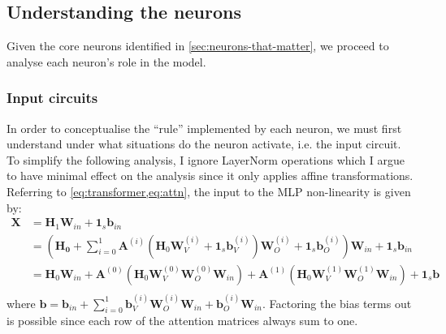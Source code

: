 \documentclass{article}
\renewcommand{\v}[1]{\mathbf{\bm{#1}}}
\newcommand{\m}[1]{\mathbf{\bm{#1}}}
\begin{document}
\subsection{Understanding the neurons} \label{sec:neurons-visualisation}

Given the core neurons identified in \cref{sec:neurons-that-matter}, we proceed to analyse each neuron's role in the model.

\subsubsection{Input circuits}

In order to conceptualise the ``rule'' implemented by each neuron, we must first understand under what situations do the neuron activate, i.e. the input circuit. To simplify the following analysis, I ignore LayerNorm operations which I argue to have minimal effect on the analysis since it only applies affine transformations. Referring to \cref{eq:transformer,eq:attn}, the input to the MLP non-linearity is given by:
\begin{equation*}
    \begin{aligned}
        \m{X} & = \m{H}_1 \m{W}_{in} + \v{1}_s \v{b}_{in} \\
              & = \left(
        \m{H_0}
        + \sum_{i=0}^1 \m{A}^{(i)} (
        \m{H}_0 \m{W}_V^{(i)} + \v{1}_s \v{b}_V^{(i)}
        ) \m{W}_O^{(i)} + \v{1}_s \v{b}_O^{(i)}
        \right) \m{W}_{in} + \v{1}_s \v{b}_{in}           \\
              & = \m{H}_0 \m{W}_{in}
        + \m{A}^{(0)} (\m{H}_0 \m{W}_V^{(0)} \m{W}_O^{(0)} \m{W}_{in})
        + \m{A}^{(1)} (\m{H}_0 \m{W}_V^{(1)} \m{W}_O^{(1)} \m{W}_{in})
        + \v{1}_s \v{b}                                   \\
    \end{aligned}
\end{equation*}
where $\v{b} = \v{b}_{in} + \sum_{i=0}^{1} \v{b}_V^{(i)} \m{W}_O^{(i)} \m{W}_{in} + \v{b}_O^{(i)} \m{W}_{in}$. Factoring the bias terms out is possible since each row of the attention matrices always sum to one.
\end{document}
